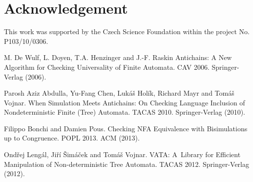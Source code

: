\documentclass{eeict}
\begin{document}
\begin{comment}
\subsection{Bisimulation up to congruence}
The another approach to checking inclusion over NFA is based on bisimulation up to congruence. This approach is primary for checking language equivalence but it can
also be used for checking language inclusion, when you consider that $L(A)\cup L(B)= L(B) \Rightarrow L(A)\subseteq L(B)$. 
The congruence algorithm is based on familiar principle as antichain algorithm. 
It starts determinization of $A$ and $B$ simultaneously and checks, if newly generated states are equivalent (if they are either
finale or not). Optimization is based on computing congruence closure on the set of generated pair of states. 
If the newly generate pair is in this congruence
closure, it could be skipped. 
\end{comment}



%
\section*{Acknowledgement}
This work was supported by the Czech Science Foundation within the project No. P103/10/0306.
%
\begin{thebibliography}{9}
   M. De Wulf, L. Doyen, T.A. Henzinger and J.-F. Raskin  Antichains: A
		New Algorithm for Checking Universality of Finite Automata. CAV 2006. Springer-Verlag (2006).

   Parosh Aziz Abdulla, Yu-Fang Chen, Lukáš Holík, Richard Mayr and
		Tomáš Vojnar. When Simulation Meets Antichains: On Checking Language Inclusion of
		Nondeterministic Finite (Tree) Automata. TACAS 2010. Springer-Verlag (2010).

	 Filippo Bonchi and Damien Pous. Checking NFA Equivalence with Bisimulations up
		to Congruence. POPL 2013. ACM (2013).
	
	 Ondřej Lengál, Jiří Šimáček and Tomáš Vojnar. VATA: A~Library for Efficient
		Manipulation of Non-deterministic Tree Automata. TACAS 2012. Springer-Verlag (2012).


\end{thebibliography}
\end{document}
